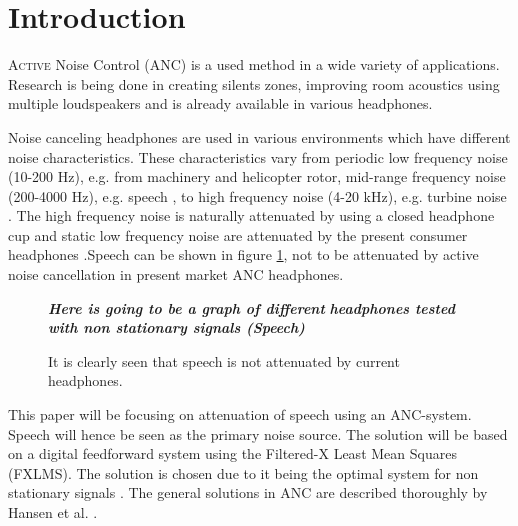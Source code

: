 \section*{Introduction}
\lettrine[lines=2]{A}{ctive} Noise Control (ANC) is a used method in a wide variety of applications. Research is being done in creating silents zones\cite{SilentZones}, improving room acoustics using multiple loudspeakers\cite{CAPS} and is already available in various headphones.

Noise canceling headphones are used in various environments which have different noise characteristics. These characteristics vary from periodic low frequency noise (10-200 Hz), e.g. from machinery and helicopter rotor\cite{LowFrequency}, mid-range frequency noise (200-4000 Hz), e.g. speech \cite{MidFrequency}, to high frequency noise (4-20 kHz), e.g. turbine noise \cite{LowFrequency}. The high frequency noise is naturally attenuated by using a closed headphone cup \cite{naturalAttenuation} and static low frequency noise are attenuated by the present consumer headphones \cite{naturalAttenuation}.Speech can be shown in figure \ref{fig:ANCcompare}, not to be attenuated by active noise cancellation in present market ANC headphones.

\begin{figure}[H]
	\centering
	\textbf{\textit{Here is going to be a graph of different}}
	\textbf{\textit{ headphones tested with non stationary signals (Speech)}}
	\caption{It is clearly seen that speech is not attenuated by current headphones.}
	\label{fig:ANCcompare}
\end{figure}


This paper will be focusing on attenuation of speech using an ANC-system. Speech will hence be seen as the primary noise source. The solution will be based on a digital feedforward system using the Filtered-X Least Mean Squares (FXLMS). The solution is chosen due to it being the optimal system for non stationary signals \cite{Hansen2}. The general solutions in ANC are described thoroughly by Hansen et al. \cite{Hansen}.

